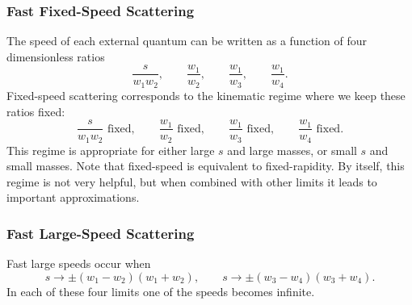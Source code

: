 \subsubsection{Fast Fixed-Speed Scattering}
The speed of each external quantum can be written as a function of four dimensionless ratios
\begin{equation}
	\frac{s}{w_{1} w_{2}}, \qquad \frac{w_{1}}{w_{2}}, \qquad \frac{w_{1}}{w_{3}}, \qquad \frac{w_{1}}{w_{4}}.
\end{equation}
Fixed-speed scattering corresponds to the kinematic regime where we keep these ratios fixed:
\begin{equation}
	\frac{s}{w_{1} w_{2}} \text{ fixed}, \qquad \frac{w_{1}}{w_{2}} \text{ fixed}, \qquad \frac{w_{1}}{w_{3}} \text{ fixed}, \qquad \frac{w_{1}}{w_{4}} \text{ fixed}.
\end{equation}
This regime is appropriate for either large $s$ and large masses, or small $s$ and small masses. Note that fixed-speed is equivalent to fixed-rapidity. By itself, this regime is not very helpful, but when combined with other limits it leads to important approximations.
\subsubsection{Fast Large-Speed Scattering}
Fast large speeds occur when
\begin{equation}
	s \rightarrow \pm \left(w_{1} - w_{2}\right)\left(w_{1} + w_{2}\right), \qquad s \rightarrow \pm \left(w_{3} - w_{4}\right)\left(w_{3} + w_{4}\right).
\end{equation}
In each of these four limits one of the speeds becomes infinite.
